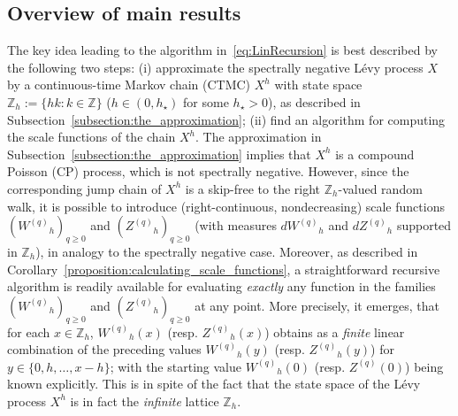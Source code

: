 \documentclass[pdftex,oneside,11pt,reqno]{amsart}
\theoremstyle{definition}
\theoremstyle{theorem}
\theoremstyle{remark}
\numberwithin{equation}{section}
\numberwithin{definition}{section}
\begin{document}
\subsection{Overview of main 
results}
\label{subsec:Main_REsults_description}
The key idea leading to the algorithm 
in~\eqref{eq:LinRecursion} 
is best described by the following two steps: 
(i) approximate the spectrally negative L\'evy process
$X$
by a
continuous-time Markov chain (CTMC) 
$X^h$ 
with state space
${\mathbb{Z}_h}:=\{hk\!\!:k\in{\mathbb Z}\}$
($h\in (0,h_\star)$ for some $h_\star>0$),
as described in Subsection~\ref{subsection:the_approximation}; 
(ii) find an algorithm for computing the scale functions
of the chain $X^h$. 
The approximation in Subsection~\ref{subsection:the_approximation}
implies that 
$X^h$
is a compound Poisson (CP) process, which is not spectrally negative.
However, since the corresponding jump chain of $X^h$ is a
skip-free to the right
${\mathbb{Z}_h}$-valued random walk, 
it is possible to introduce (right-continuous, nondecreasing) scale functions
$({W^{(q)}}_h)_{q\geq 0}$ and $({Z^{(q)}}_h)_{q\geq 0}$ (with measures 
$d{W^{(q)}}_h$ and $d{Z^{(q)}}_h$ supported in ${\mathbb{Z}_h}$), in 
analogy to the spectrally negative case.
Moreover, as described in Corollary~\ref{proposition:calculating_scale_functions}, 
a straightforward recursive algorithm is readily available for evaluating \emph{exactly} any function in the families 
$({W^{(q)}}_h)_{q\geq 0}$ and
$({Z^{(q)}}_h)_{q\geq 0}$ at any point. More precisely, it emerges, that for each $x\in {\mathbb{Z}_h}$, ${W^{(q)}}_h(x)$ (resp. ${Z^{(q)}}_h(x)$) obtains as a \emph{finite} linear combination of the preceding values ${W^{(q)}}_h(y)$ (resp. ${Z^{(q)}}_h(y)$) for $y\in \{0,h,\ldots,x-h\}$; with the starting value ${W^{(q)}}_h(0)$ (resp. ${Z^{(q)}}(0)$) being known explicitly. This is in spite of the fact that the state space of the L\'evy process $X^h$ is in fact the \emph{infinite} lattice ${\mathbb{Z}_h}$. 
\end{document}
